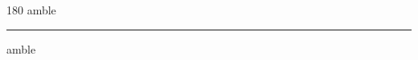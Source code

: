 
\begin{frame}
\begin{center}
\begin{turn}{180}
{\fontsize{2.5cm}{1em}\selectfont amble}
\end{turn}
\vspace{1em}\par  
\hrule
\vspace{1em}\par  
{\fontsize{2.5cm}{1em}\selectfont amble}
\end{center}
\end{frame}
